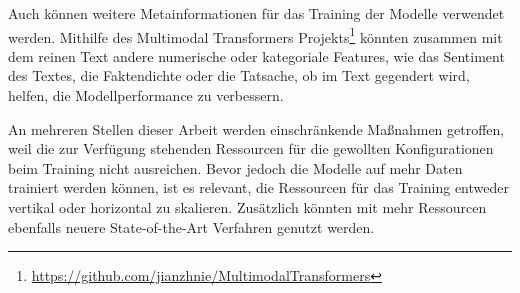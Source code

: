 Auch können weitere Metainformationen für das Training der Modelle verwendet werden. Mithilfe des Multimodal Transformers Projekts\footnote{\href{https://github.com/jianzhnie/MultimodalTransformers}{https://github.com/jianzhnie/MultimodalTransformers}} könnten zusammen mit dem reinen Text andere numerische oder kategoriale Features, wie das Sentiment des Textes, die Faktendichte oder die Tatsache, ob im Text gegendert wird, helfen, die Modellperformance zu verbessern.

An mehreren Stellen dieser Arbeit werden einschränkende Maßnahmen getroffen, weil die zur Verfügung stehenden Ressourcen für die gewollten Konfigurationen beim Training nicht ausreichen. Bevor jedoch die Modelle auf mehr Daten trainiert werden können, ist es relevant, die Ressourcen für das Training entweder vertikal oder horizontal zu skalieren. Zusätzlich könnten mit mehr Ressourcen ebenfalls neuere State-of-the-Art Verfahren genutzt werden.
